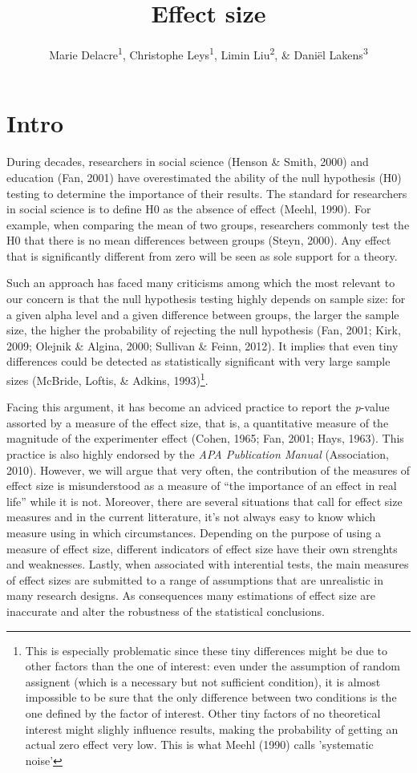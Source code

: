 \documentclass[man]{apa6}
\title{Effect size}
\author{Marie Delacre\textsuperscript{1}, Christophe Leys\textsuperscript{1}, Limin Liu\textsuperscript{2}, \& Daniël Lakens\textsuperscript{3}}
\date{}
\affiliation{
\vspace{0.5cm}
\textsuperscript{1} Université Libre de Bruxelles, Service of Analysis of the Data (SAD), Bruxelles, Belgium\\\textsuperscript{2} Université de Gant\\\textsuperscript{3} Eindhoven University of Technology, Human Technology Interaction Group, Eindhoven, the Netherlands }
\let\rmarkdownfootnote\footnote%
\def\footnote{\protect\rmarkdownfootnote}
\begin{document}
\maketitle

\hypertarget{intro}{%
\section{Intro}\label{intro}}

During decades, researchers in social science (Henson \& Smith, 2000) and education (Fan, 2001) have overestimated the ability of the null hypothesis (H0) testing to determine the importance of their results. The standard for researchers in social science is to define H0 as the absence of effect (Meehl, 1990). For example, when comparing the mean of two groups, researchers commonly test the H0 that there is no mean differences between groups (Steyn, 2000). Any effect that is significantly different from zero will be seen as sole support for a theory.

Such an approach has faced many criticisms among which the most relevant to our concern is that the null hypothesis testing highly depends on sample size: for a given alpha level and a given difference between groups, the larger the sample size, the higher the probability of rejecting the null hypothesis (Fan, 2001; Kirk, 2009; Olejnik \& Algina, 2000; Sullivan \& Feinn, 2012). It implies that even tiny differences could be detected as statistically significant with very large sample sizes (McBride, Loftis, \& Adkins, 1993)\footnote{This is especially problematic since these tiny differences might be due to other factors than the one of interest: even under the assumption of random assignent (which is a necessary but not sufficient condition), it is almost impossible to be sure that the only difference between two conditions is the one defined by the factor of interest. Other tiny factors of no theoretical interest might slighly influence results, making the probability of getting an actual zero effect very low. This is what Meehl (1990) calls 'systematic noise'}.

Facing this argument, it has become an adviced practice to report the \emph{p}-value assorted by a measure of the effect size, that is, a quantitative measure of the magnitude of the experimenter effect (Cohen, 1965; Fan, 2001; Hays, 1963). This practice is also highly endorsed by the \emph{APA Publication Manual} (Association, 2010). However, we will argue that very often, the contribution of the measures of effect size is misunderstood as a measure of \enquote{the importance of an effect in real life} while it is not. Moreover, there are several situations that call for effect size measures and in the current litterature, it's not always easy to know which measure using in which circumstances. Depending on the purpose of using a measure of effect size, different indicators of effect size have their own strenghts and weaknesses. Lastly, when associated with interential tests, the main measures of effect sizes are submitted to a range of assumptions that are unrealistic in many research designs. As consequences many estimations of effect size are inaccurate and alter the robustness of the statistical conclusions.
\end{document}
